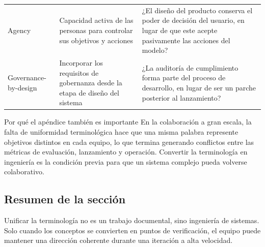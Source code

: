 \begin{longtable}{p{}p{}p{}}
Agency & Capacidad activa de las personas para controlar sus objetivos y acciones & ¿El diseño del producto conserva el poder de decisión del usuario, en lugar de que este acepte pasivamente las acciones del modelo? \\
Governance-by-design & Incorporar los requisitos de gobernanza desde la etapa de diseño del sistema & ¿La auditoría de cumplimiento forma parte del proceso de desarrollo, en lugar de ser un parche posterior al lanzamiento? \\
\bottomrule
\end{longtable}

\begin{knowledgebox}{Por qué el apéndice también es importante}
En la colaboración a gran escala, la falta de uniformidad terminológica hace que una misma palabra represente objetivos distintos en cada equipo, lo que termina generando conflictos entre las métricas de evaluación, lanzamiento y operación. Convertir la terminología en ingeniería es la condición previa para que un sistema complejo pueda volverse colaborativo.
\end{knowledgebox}

\subsection{Resumen de la sección}

Unificar la terminología no es un trabajo documental, sino ingeniería de sistemas. Solo cuando los conceptos se convierten en puntos de verificación, el equipo puede mantener una dirección coherente durante una iteración a alta velocidad.

